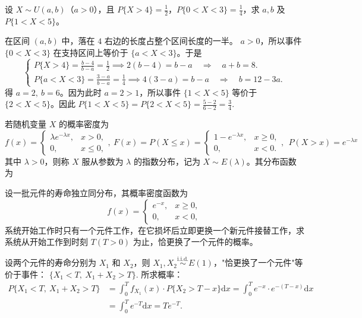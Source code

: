 \documentclass[lang=cn,11pt]{elegantbook}
\begin{document}
\begin{exercise}\label{exer:2-16}
设 $X \sim U(a,b)$（$a>0$），且 $P\{X>4\} = \frac{1}{2}$，$P\{0<X<3\} = \frac{1}{4}$，求 $a,b$ 及 $P\{1<X<5\}$。
\end{exercise}
\begin{solution}
在区间 \((a,b)\) 中，落在 \(4\) 右边的长度占整个区间长度的一半。 \(a>0\)，所以事件 \(\{0<X<3\}\) 在支持区间上等价于 \(\{a<X<3\}\)。于是
\[\begin{cases}
P\{X>4\}=\frac{b-4}{b-a}=\frac12\implies
2(b-4)=b-a \quad \Longrightarrow \quad a+b=8.\\
P\{a<X<3\}=\frac{3-a}{b-a}=\frac14\implies
4(3-a)=b-a \quad \Longrightarrow \quad b=12-3a.
\end{cases}
\]
得 \(a=2,\ b=6\)。因为此时 \(a=2>1\)，所以事件 \(\{1<X<5\}\) 等价于 \(\{2<X<5\}\)。因此
\(
P\{1<X<5\}=P\{2<X<5\}=\frac{5-2}{6-2}=\frac34.
\)
\end{solution}

\begin{definition}[指数分布] \label{def:exp-dist}
若随机变量 $X$ 的概率密度为
\[
f(x) = \begin{cases}
\lambda e^{-\lambda x}, & x > 0, \\
0, & x \le 0,
\end{cases},~
F(x) =P(X\leqslant x)= \begin{cases}
1 - e^{-\lambda x}, & x \ge 0, \\
0, & x < 0.
\end{cases},~~ P(X>x)=e^{-\lambda x}
\]
其中 $\lambda > 0$，则称 $X$ 服从参数为 $\lambda$ 的指数分布，记为 $X \sim E(\lambda)$。其分布函数为
\end{definition}

\begin{exercise}[指数分布与系统更换]
设一批元件的寿命独立同分布，其概率密度函数为
\[
f(x)=
\begin{cases}
e^{-x}, & x\geqslant0, \\
0, & x<0,
\end{cases}
\]
系统开始工作时只有一个元件工作，在它损坏后立即更换一个新元件接替工作，求系统从开始工作到时刻 $T(T>0)$ 为止，恰更换了一个元件的概率。
\end{exercise}
\begin{solution}
设两个元件的寿命分别为 $X_1$ 和 $X_2$，则 $X_1, X_2 \stackrel{\text{i.i.d.}}{\sim} E(1)$，"恰更换了一个元件"等价于事件：
\(
\{X_1 < T,\ X_1+X_2 > T\}.
\)
所求概率：
\[
\begin{aligned}
P\{X_1 < T,\ X_1+X_2 > T\} &= \int_0^T f_{X_1}(x)\cdot P\{X_2 > T-x\}\mathrm dx = \int_0^T e^{-x}\cdot e^{-(T-x)}\mathrm dx \\
&= \int_0^T e^{-T}\mathrm dx = Te^{-T}.
\end{aligned}
\]
\end{solution}
\end{document}
